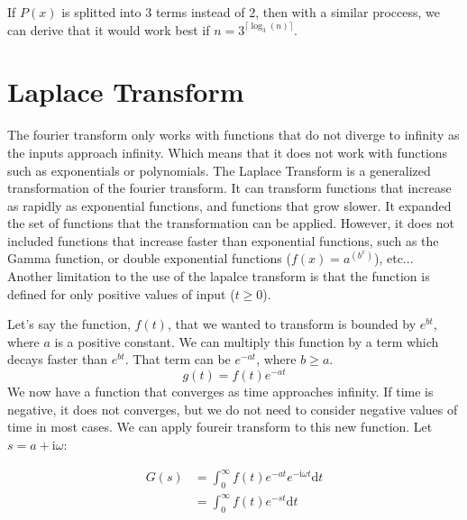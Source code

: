 \documentclass[12pt]{article}
\begin{document}
If $P(x)$ is splitted into 3 terms instead of 2, then with a similar proccess, we can derive that it would work best 
if $n=3^{\lceil\log_{3}(n)\rceil}$. 










\section{Laplace Transform}
The fourier transform only works with functions that do not diverge to infinity as the inputs approach infinity. 
Which means that it does not work with functions such as exponentials or polynomials. The Laplace Transform is a 
generalized transformation of the fourier transform. It can transform functions that increase as rapidly as 
exponential functions, and functions that grow slower. It expanded the set of functions that the transformation 
can be applied. However, it does not included functions that increase faster than exponential functions, such as the 
Gamma function, or double exponential functions ($f(x)=a^{(b^x)}$), etc... Another limitation to the use of the 
lapalce transform is that the function is defined for only positive values of input ($t\geq 0$). 

\indent Let's say the function, $f(t)$, that we wanted to transform is bounded by $e^{bt}$, 
where $a$ is a positive constant. We can multiply this function by a term 
which decays faster than $e^{bt}$. That term can be $e^{-at}$, where $b\geq a$. 
$$ g(t) = f(t)e^{-at} $$
We now have a function that converges as time approaches infinity.
If time is negative, it does not converges, but we do not need to consider negative 
values of time in most cases. We can apply foureir transform to this new function. 
Let $s=a+\mathrm{i}\omega$: 

$$\begin{aligned}
    G(s) &= \int_{0}^{\infty} 
                    f(t)e^{-at}e^{-\mathrm{i}\omega t} \mathrm{d}t  \\
    &= \int_{0}^{\infty} f(t)e^{-st} \mathrm{d}t
\end{aligned}$$
\end{document}
